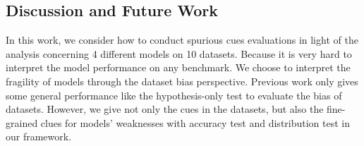 
%

\subsection{Discussion and Future Work}
In this work, we consider how to conduct spurious cues evaluations
in light of the analysis concerning 4 different models on 10 datasets. 
Because it is very hard to interpret the model 
performance on any benchmark. We choose to interpret the fragility of models through 
the dataset bias perspective. 
Previous work only gives some general performance like the hypothesis-only test to 
evaluate the bias of datasets. However, we give not only the cues in the datasets, but also  
the fine-grained clues for models' weaknesses with accuracy test and distribution test in 
our framework. 

